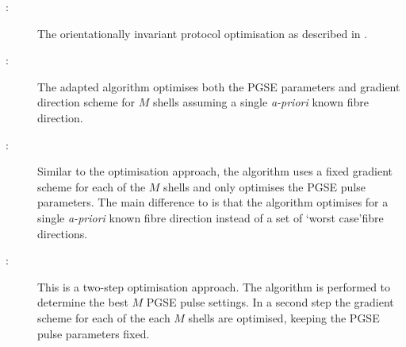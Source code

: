 \begin{description}
	\item[\OI:] The orientationally invariant protocol optimisation as described in \citep{Alexander:2008}.
	\item[\FD:] The adapted algorithm optimises both the PGSE parameters and gradient direction scheme for $M$ shells assuming a single \textit{a-priori} known fibre direction.
	\item[\SD:] Similar to the {\OI} optimisation approach, the algorithm uses a fixed gradient scheme for each of the $M$ shells and only optimises the PGSE pulse parameters. The main difference to \OI{} is that the algorithm optimises for a single \textit{a-priori} known fibre direction instead of a set of \lq worst case\rq fibre directions.
	\item[\DO:] This is a two-step optimisation approach. The {\SD} algorithm is performed to determine the best $M$ PGSE pulse settings. In a second step the gradient scheme for each of the each $M$ shells are optimised, keeping the PGSE pulse parameters fixed.
\end{description}

